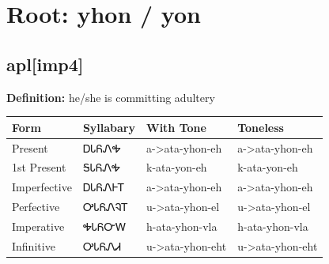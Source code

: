 \documentclass{article}%
\begin{document}
%
\normalsize%
\section*{Root: yhon / yon}%
\subsection*{apl[imp4]}%
\textbf{Definition: }%
he/she is committing adultery%
\\[0.5em]%
\begin{tabular}{|l|l|l|l|}%
\hline%
\textbf{Form}&\textbf{Syllabary}&\textbf{With Tone}&\textbf{Toneless}\\%
\hline%
Present&ᎠᏓᏲᏁᎭ&a{-}>ata{-}yhon{-}eh&a{-}>ata{-}yhon{-}eh\\%
1st Present&ᎦᏓᏲᏁᎭ&k{-}ata{-}yon{-}eh&k{-}ata{-}yon{-}eh\\%
Imperfective&ᎠᏓᏲᏁᎰᎢ&a{-}>ata{-}yhon{-}eh&a{-}>ata{-}yhon{-}eh\\%
Perfective&ᎤᏓᏲᏁᎸᎢ&u{-}>ata{-}yhon{-}el&u{-}>ata{-}yhon{-}el\\%
Imperative&ᎭᏓᏲᏅᎳ&h{-}ata{-}yhon{-}vla&h{-}ata{-}yhon{-}vla\\%
Infinitive&ᎤᏓᏲᏁᏗ&u{-}>ata{-}yhon{-}eht&u{-}>ata{-}yhon{-}eht\\%
\hline%
\end{tabular}%
\\[1em]%
\end{document}
